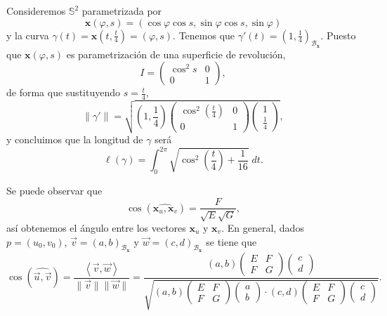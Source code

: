 \begin{eg}
Consideremos $\displaystyle \mathbb{S}^{2} $ parametrizada por 
\[\textbf{x} \left(\varphi, s\right)=\left(\cos \varphi \cos s, \sin\varphi \cos s, \sin \varphi\right) \]
y la curva $\displaystyle \gamma\left(t\right)= \textbf{x} \left(t, \frac{t}{4}\right)=\left(\varphi, s\right) $. Tenemos que $\displaystyle \gamma'\left(t\right)=\left(1, \frac{1}{4}\right)_{\mathcal{B}_{ \textbf{x} }} $. Puesto que $\displaystyle \textbf{x} \left(\varphi, s\right) $ es parametrización de una superficie de revolución,
\[I = \begin{pmatrix} \cos ^{2}s & 0 \\ 0 & 1 \end{pmatrix} ,\]
de forma que sustituyendo $\displaystyle s = \frac{t}{4} $, 
\[\|\gamma'\| = \sqrt{\left(1, \frac{1}{4}\right)\begin{pmatrix}  \cos ^{2}\left(\frac{t}{4}\right) & 0 \\ 0 & 1 \end{pmatrix}\begin{pmatrix} 1 \\ \frac{1}{4} \end{pmatrix}} ,\]
y concluimos que la longitud de $\displaystyle \gamma  $ será
\[\ell\left(\gamma \right)=\int^{2\pi }_{0} \sqrt{\cos ^{2}\left(\frac{t}{4}\right) + \frac{1}{16}} \; dt .\]
\end{eg}
\begin{observation}
Se puede observar que 
\[\cos\left(\widehat{ \textbf{x} _{u}, \textbf{x} _{v}}\right) = \frac{F}{\sqrt{E}\sqrt{G}} ,\]
así obtenemos el ángulo entre los vectores $\displaystyle \textbf{x} _{u} $ y $\displaystyle \textbf{x} _{v} $.
En general, dados $\displaystyle p = \left(u_{0}, v_{0}\right) $, $\displaystyle \vec{v}=\left(a,b\right)_{ \mathcal{B}_{ \textbf{x} }} $ y $\displaystyle \vec{w}= \left(c,d\right)_{\mathcal{B}_{ \textbf{x} }} $ se tiene que 
\[\cos \left(\widehat{\vec{u}, \vec{v}}\right)  =\frac{\left\langle \vec{v}, \vec{w} \right\rangle }{\|\vec{v}\|\|\vec{w}\|} = \frac{\left(a,b\right)\begin{pmatrix} E & F \\ F & G \end{pmatrix}\begin{pmatrix} c \\ d \end{pmatrix}}{\sqrt{\left(a,b\right)\begin{pmatrix} E & F \\ F & G \end{pmatrix}\begin{pmatrix} a \\ b \end{pmatrix} \cdot 
\left(c,d\right)\begin{pmatrix}  E & F \\ F & G \end{pmatrix}\begin{pmatrix} c\\ d \end{pmatrix}}} .\]
\end{observation}
